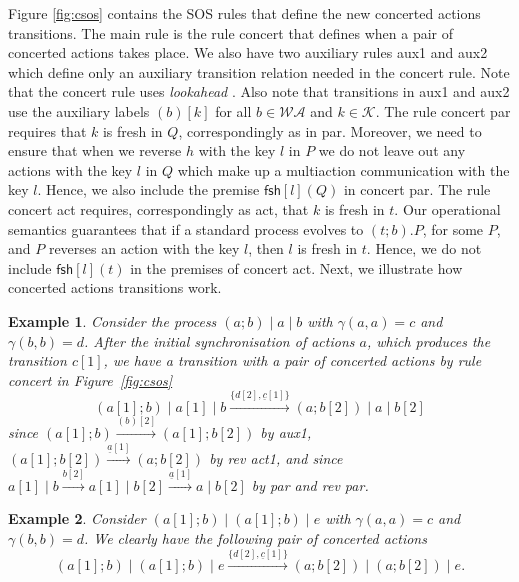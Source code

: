 \documentclass[review]{elsarticle}
\newcommand{\paral}{\; \vert \;}
\newcommand{\mWA}{\mathcal{WA}}
\newcommand{\Keys}{\mathcal{K}}
\newcommand{\fresh}[2]{\mathsf{fsh}[#1](#2)}
\newcommand{\rulename}[1]{\textsf{#1}}
\newtheorem{example}{Example}
\begin{document}
Figure \ref{fig:csos} contains the SOS rules that define the new concerted actions transitions. 
The main rule is the rule \rulename{concert} that defines when a pair of concerted actions 
takes place.  We also have two auxiliary rules \rulename{aux1} and \rulename{aux2} which 
define only an auxiliary transition relation needed in the \rulename{concert} rule. 
Note that the \rulename{concert} rule uses \emph{lookahead} \cite{Uli92}.
Also note that transitions in \rulename{aux1} and \rulename{aux2} use the auxiliary labels $(b)[k]$ 
for all $b \in \mWA$ and $k \in \Keys$. The rule \rulename{concert par} requires that $k$ is fresh in $Q$,
correspondingly as in \rulename{par}. Moreover, we need to ensure that when we reverse $h$ with the key $l$
in $P$ we do not leave out any actions with the key $l$ in $Q$ which make up a multiaction 
communication with the key $l$. Hence, we also include the premise $\fresh{l}{Q}$ in \rulename{concert par}.
The rule \rulename{concert act} requires, correspondingly as \rulename{act}, that $k$ is fresh in $t$.
Our operational semantics guarantees that if a standard process evolves to $(t;b).P$, for some $P$, and
$P$ reverses an action with the key $l$, then $l$ is fresh in $t$. Hence, we do not include $\fresh{l}{t}$
in the premises of \rulename{concert act}.
%
Next, we illustrate how concerted actions transitions work.

\begin{example}\label{ex:examp1}
{\rm Consider the process $(a;b) \paral a \paral b$ with $\gamma(a,a)=c$ and $\gamma(b,b)=d$. After the
initial synchronisation of actions $a$, which produces the transition $c[1]$, we have a transition
with a pair of concerted actions by rule \rulename{concert} in Figure~\ref{fig:csos}
$$(a[1];b) \paral a[1] \paral  b \xrightarrow{\{d[2], \underline{c}[1]\}} 
  (a;b[2])\paral a \paral b[2]$$
since $(a[1];b) \xrightarrow{(b)[2]} (a[1];b[2])$ by \rulename{aux1}, 
$(a[1];b[2]) \xrightarrow{\underline{a}[1]} (a;b[2])$ by \rulename{rev act1}, 
and since $a[1] \paral b \xrightarrow{b[2]} a[1] \paral b[2] \xrightarrow{\underline{a}[1]} a \paral b[2]$
by \rulename{par} and \rulename{rev par}.}
\end{example}

\begin{example}\label{ex:examp2}
{\rm Consider $(a[1];b)\paral (a[1];b)\paral e$ with $\gamma(a,a)=c$ and $\gamma(b,b)=d$.
We clearly have the following pair of concerted actions
 $$(a[1];b)\paral (a[1];b)\paral e  \xrightarrow{\{d[2], \underline{c}[1]\}} 
(a;b[2])\paral (a;b[2])\paral e. $$}
\end{example}
\end{document}
